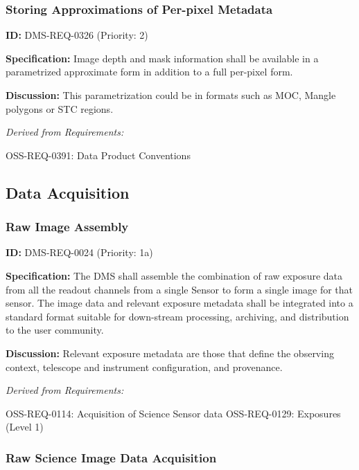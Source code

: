 \documentclass[SE,toc,lsstdraft]{lsstdoc}
\begin{document}
\subsubsection{Storing Approximations of Per-pixel Metadata}

\label{DMS-REQ-0326}
\textbf{ID:} DMS-REQ-0326 (Priority: 2)

\textbf{Specification:} Image depth and mask information shall be available in a parametrized approximate form in addition to a full per-pixel form.

\textbf{Discussion:} This parametrization could be in formats such as MOC, Mangle polygons or STC regions.

\emph{Derived from Requirements:}

OSS-REQ-0391:
Data Product Conventions \newline

\subsection{Data Acquisition}

\subsubsection{Raw Image Assembly}

\label{DMS-REQ-0024}
\textbf{ID:} DMS-REQ-0024 (Priority: 1a)

\textbf{Specification:} The DMS shall assemble the combination of raw exposure data from all the readout channels from a single Sensor to form a single image for that sensor. The image data and relevant exposure metadata shall be integrated into a standard format suitable for down-stream processing, archiving, and distribution to the user community.

\textbf{Discussion:} Relevant exposure metadata are those that define the observing context, telescope and instrument configuration, and provenance.

\emph{Derived from Requirements:}

OSS-REQ-0114:
Acquisition of Science Sensor data \newline
OSS-REQ-0129:
Exposures (Level 1) \newline

\subsubsection{Raw Science Image Data Acquisition}
\end{document}
